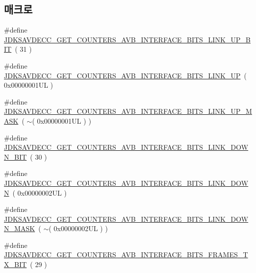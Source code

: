 \subsection*{매크로}
\begin{DoxyCompactItemize}
\item 
\#define \hyperlink{group__get__counters__avb__interface__bits_ga779126b3eca300447ca4517c0f745756}{J\+D\+K\+S\+A\+V\+D\+E\+C\+C\+\_\+\+G\+E\+T\+\_\+\+C\+O\+U\+N\+T\+E\+R\+S\+\_\+\+A\+V\+B\+\_\+\+I\+N\+T\+E\+R\+F\+A\+C\+E\+\_\+\+B\+I\+T\+S\+\_\+\+L\+I\+N\+K\+\_\+\+U\+P\+\_\+\+B\+IT}~( 31 )
\item 
\#define \hyperlink{group__get__counters__avb__interface__bits_ga328aaf9b426fa89701b39af6ccc51859}{J\+D\+K\+S\+A\+V\+D\+E\+C\+C\+\_\+\+G\+E\+T\+\_\+\+C\+O\+U\+N\+T\+E\+R\+S\+\_\+\+A\+V\+B\+\_\+\+I\+N\+T\+E\+R\+F\+A\+C\+E\+\_\+\+B\+I\+T\+S\+\_\+\+L\+I\+N\+K\+\_\+\+UP}~( 0x00000001\+U\+L )
\item 
\#define \hyperlink{group__get__counters__avb__interface__bits_gaa501a156c7f656ec598647d194afc8c1}{J\+D\+K\+S\+A\+V\+D\+E\+C\+C\+\_\+\+G\+E\+T\+\_\+\+C\+O\+U\+N\+T\+E\+R\+S\+\_\+\+A\+V\+B\+\_\+\+I\+N\+T\+E\+R\+F\+A\+C\+E\+\_\+\+B\+I\+T\+S\+\_\+\+L\+I\+N\+K\+\_\+\+U\+P\+\_\+\+M\+A\+SK}~( $\sim$( 0x00000001\+U\+L ) )
\item 
\#define \hyperlink{group__get__counters__avb__interface__bits_gad28b1773ab4beff2229f60185467e60f}{J\+D\+K\+S\+A\+V\+D\+E\+C\+C\+\_\+\+G\+E\+T\+\_\+\+C\+O\+U\+N\+T\+E\+R\+S\+\_\+\+A\+V\+B\+\_\+\+I\+N\+T\+E\+R\+F\+A\+C\+E\+\_\+\+B\+I\+T\+S\+\_\+\+L\+I\+N\+K\+\_\+\+D\+O\+W\+N\+\_\+\+B\+IT}~( 30 )
\item 
\#define \hyperlink{group__get__counters__avb__interface__bits_ga6d5bbef843f456c73ae7ee1a43da2ce5}{J\+D\+K\+S\+A\+V\+D\+E\+C\+C\+\_\+\+G\+E\+T\+\_\+\+C\+O\+U\+N\+T\+E\+R\+S\+\_\+\+A\+V\+B\+\_\+\+I\+N\+T\+E\+R\+F\+A\+C\+E\+\_\+\+B\+I\+T\+S\+\_\+\+L\+I\+N\+K\+\_\+\+D\+O\+WN}~( 0x00000002\+U\+L )
\item 
\#define \hyperlink{group__get__counters__avb__interface__bits_ga6904a8ea00deb4e6a26f780e3a1cf154}{J\+D\+K\+S\+A\+V\+D\+E\+C\+C\+\_\+\+G\+E\+T\+\_\+\+C\+O\+U\+N\+T\+E\+R\+S\+\_\+\+A\+V\+B\+\_\+\+I\+N\+T\+E\+R\+F\+A\+C\+E\+\_\+\+B\+I\+T\+S\+\_\+\+L\+I\+N\+K\+\_\+\+D\+O\+W\+N\+\_\+\+M\+A\+SK}~( $\sim$( 0x00000002\+U\+L ) )
\item 
\#define \hyperlink{group__get__counters__avb__interface__bits_ga0c405b8255397c5ab4825affac1f70d4}{J\+D\+K\+S\+A\+V\+D\+E\+C\+C\+\_\+\+G\+E\+T\+\_\+\+C\+O\+U\+N\+T\+E\+R\+S\+\_\+\+A\+V\+B\+\_\+\+I\+N\+T\+E\+R\+F\+A\+C\+E\+\_\+\+B\+I\+T\+S\+\_\+\+F\+R\+A\+M\+E\+S\+\_\+\+T\+X\+\_\+\+B\+IT}~( 29 )

\end{DoxyCompactItemize}
